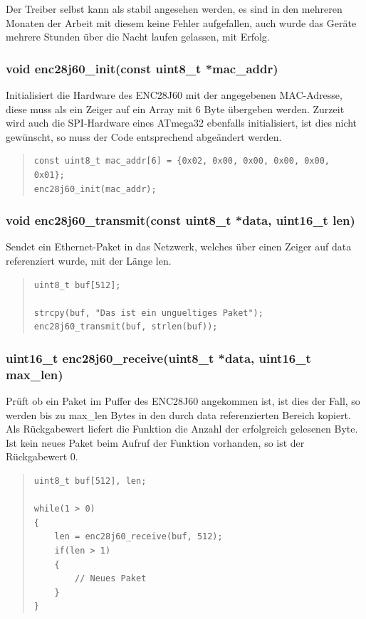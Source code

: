 \documentclass[a4paper,14pt,headsepline]{scrartcl}
\begin{document}
Der Treiber selbst kann als stabil angesehen werden, es sind in den mehreren Monaten der Arbeit mit diesem keine Fehler aufgefallen, auch wurde das Geräte mehrere Stunden über die Nacht laufen gelassen, mit Erfolg.

\newpage

\subsubsection*{void enc28j60\_init(const uint8\_t *mac\_addr)}
Initialisiert die Hardware des ENC28J60 mit der angegebenen MAC-Adresse, diese muss als ein Zeiger auf ein Array mit 6 Byte übergeben werden. Zurzeit wird auch die SPI-Hardware eines ATmega32 ebenfalls initialisiert, ist dies nicht gewünscht, so muss der Code entsprechend abgeändert werden.

\begin{quote}
\begin{verbatim}
const uint8_t mac_addr[6] = {0x02, 0x00, 0x00, 0x00, 0x00, 0x01};
enc28j60_init(mac_addr);
\end{verbatim}
\end{quote}

\subsubsection*{void enc28j60\_transmit(const uint8\_t *data, uint16\_t len)}
Sendet ein Ethernet-Paket in das Netzwerk, welches über einen Zeiger auf data referenziert wurde, mit der Länge len.
\begin{quote}
\begin{verbatim}
uint8_t buf[512];

strcpy(buf, "Das ist ein ungueltiges Paket");
enc28j60_transmit(buf, strlen(buf));
\end{verbatim}
\end{quote}

\newpage

\subsubsection*{uint16\_t enc28j60\_receive(uint8\_t *data, uint16\_t max\_len)}
Prüft ob ein Paket im Puffer des ENC28J60 angekommen ist, ist dies der Fall, so werden bis zu max\_len Bytes in den durch data referenzierten Bereich kopiert. Als Rückgabewert liefert die Funktion die Anzahl der erfolgreich gelesenen Byte. Ist kein neues Paket beim Aufruf der Funktion vorhanden, so ist der Rückgabewert 0.
\begin{quote}
\begin{verbatim}
uint8_t buf[512], len;

while(1 > 0)
{
    len = enc28j60_receive(buf, 512);
    if(len > 1)
    {
        // Neues Paket
    }
}
\end{verbatim}
\end{quote}
\end{document}
